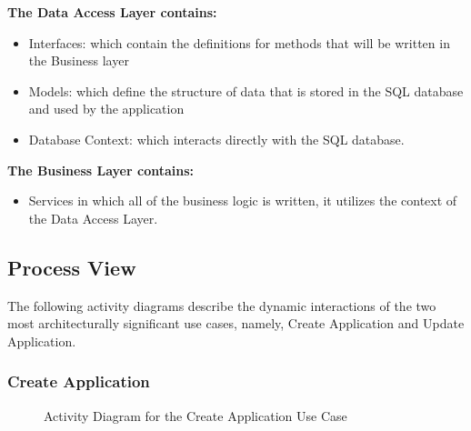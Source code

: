 \documentclass[11pt]{article}
\begin{document}
\textbf{The Data Access Layer contains:}
\begin{itemize}
	\item  Interfaces: which contain the definitions for methods that will be written in the Business layer
	\item  Models: which define the structure of data that is stored in the SQL database and used by the application
	\item Database Context: which interacts directly with the SQL database.
\end{itemize}

\textbf{The Business Layer contains:}
\begin{itemize}
	\item  Services in which all of the business logic is written, it utilizes the context of the Data Access Layer. 
\end{itemize}
\subsection{Process View}
The following activity diagrams describe the dynamic interactions of the two most architecturally significant use cases, namely, Create Application and Update Application.
\subsubsection{Create Application}

\begin{figure}[H]
	\caption{Activity Diagram for the Create Application Use Case}
\end{figure}
\end{document}
